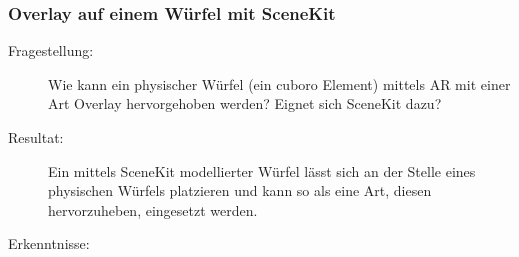\subsubsection{Overlay auf einem Würfel mit SceneKit}
\begin{description}
	\item[Fragestellung:] Wie kann ein physischer Würfel (ein cuboro Element) mittels AR mit einer Art Overlay hervorgehoben werden? Eignet sich SceneKit dazu?
	\item[Resultat:] Ein mittels SceneKit modellierter Würfel lässt sich an der Stelle eines physischen Würfels platzieren und kann so als eine Art, diesen hervorzuheben, eingesetzt werden.
	\item[Erkenntnisse:]
\end{description}
